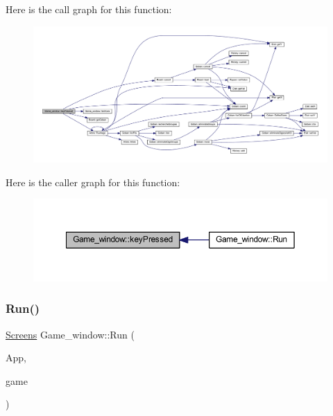 Here is the call graph for this function\+:\nopagebreak
\begin{figure}[H]
\begin{center}
\leavevmode
\includegraphics[width=350pt]{class_game__window_a72304de2044c29f1373037bd818f674f_cgraph}
\end{center}
\end{figure}
Here is the caller graph for this function\+:\nopagebreak
\begin{figure}[H]
\begin{center}
\leavevmode
\includegraphics[width=350pt]{class_game__window_a72304de2044c29f1373037bd818f674f_icgraph}
\end{center}
\end{figure}
\mbox{\label{class_game__window_aec21feecf4c72d73c13d82aa12df6930}} 
\subsubsection{\texorpdfstring{Run()}{Run()}}
{\footnotesize\ttfamily \hyperlink{_globals_8h_a3d5776bab98402b03be09156bacf4f68}{Screens} Game\+\_\+window\+::\+Run (\begin{DoxyParamCaption}\item[{sf\+::\+Render\+Window \&}]{App,  }\item[{\hyperlink{class_game__window}{Game\+\_\+window} \&}]{game }\end{DoxyParamCaption})\hspace{0.3cm}{\ttfamily [virtual]}}



